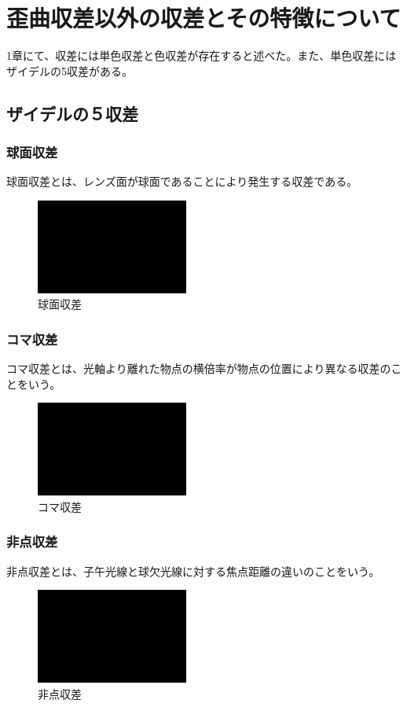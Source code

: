 \section{歪曲収差以外の収差とその特徴について}
1章にて、収差には単色収差と色収差が存在すると述べた。また、単色収差にはザイデルの5収差がある。
\subsection{ザイデルの５収差}
\subsubsection{球面収差}
球面収差とは、レンズ面が球面であることにより発生する収差である。
\begin{figure}[h]
	\centering
	\includegraphics[width=50mm]{image/dummy.png.eps}
	\caption{球面収差}
	\label{caption1}
\end{figure}

\subsubsection{コマ収差}
コマ収差とは、光軸より離れた物点の横倍率が物点の位置により異なる収差のことをいう。
\begin{figure}[h]
	\centering
	\includegraphics[width=50mm]{image/dummy.png.eps}
	\caption{コマ収差}
	\label{caption1}
\end{figure}

\subsubsection{非点収差}
非点収差とは、子午光線と球欠光線に対する焦点距離の違いのことをいう。
\begin{figure}[h]
	\centering
	\includegraphics[width=50mm]{image/dummy.png.eps}
	\caption{非点収差}
	\label{caption1}
\end{figure}


